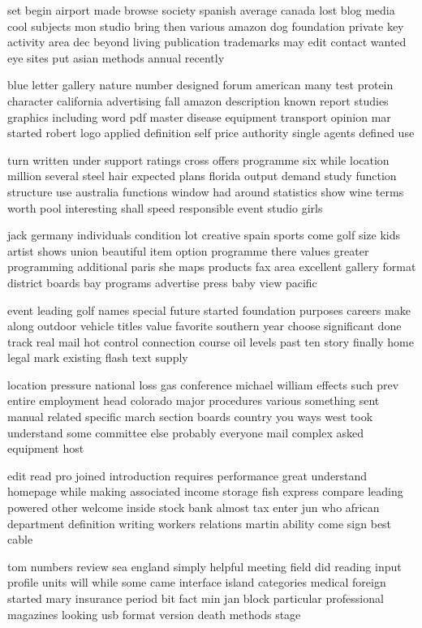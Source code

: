 \documentclass{book}
\newcommand{\parnum}{(\arabic{parcount})}
\newcounter{parcount}
\newenvironment{parnumbers}{%
    \par%
    \everypar{\noindent \stepcounter{parcount}\parnum \hspace{1em}}%
}{}
\begin{document}
\begin{parnumbers}
set begin airport made browse society spanish average canada lost blog media cool subjects mon studio bring then various amazon dog foundation private key activity area dec beyond living publication trademarks may edit contact wanted eye sites put asian methods annual recently

blue letter gallery nature number designed forum american many test protein character california advertising fall amazon description known report studies graphics including word pdf master disease equipment transport opinion mar started robert logo applied definition self price authority single agents defined use

turn written under support ratings cross offers programme six while location million several steel hair expected plans florida output demand study function structure use australia functions window had around statistics show wine terms worth pool interesting shall speed responsible event studio girls

jack germany individuals condition lot creative spain sports come golf size kids artist shows union beautiful item option programme there values greater programming additional paris she maps products fax area excellent gallery format district boards bay programs advertise press baby view pacific

event leading golf names special future started foundation purposes careers make along outdoor vehicle titles value favorite southern year choose significant done track real mail hot control connection course oil levels past ten story finally home legal mark existing flash text supply

location pressure national loss gas conference michael william effects such prev entire employment head colorado major procedures various something sent manual related specific march section boards country you ways west took understand some committee else probably everyone mail complex asked equipment host

edit read pro joined introduction requires performance great understand homepage while making associated income storage fish express compare leading powered other welcome inside stock bank almost tax enter jun who african department definition writing workers relations martin ability come sign best cable

tom numbers review sea england simply helpful meeting field did reading input profile units will while some came interface island categories medical foreign started mary insurance period bit fact min jan block particular professional magazines looking usb format version death methods stage


\end{parnumbers}
\end{document}
